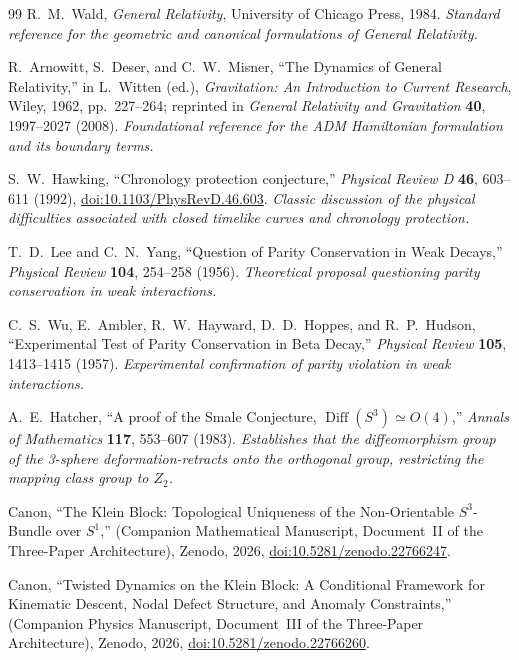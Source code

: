 \documentclass[11pt]{article}
\theoremstyle{canonstyle}
\providecommand{\Diff}{\operatorname{Diff}}
\def\mathbb#1{#1}%
\begin{document}
\begin{thebibliography}{99}
R.~M.~Wald, \textit{General Relativity}, University of Chicago Press, 1984.
\textit{Standard reference for the geometric and canonical formulations of General Relativity.}

R.~Arnowitt, S.~Deser, and C.~W.~Misner, ``The Dynamics of General Relativity,'' in L.~Witten (ed.), \textit{Gravitation: An Introduction to Current Research}, Wiley, 1962, pp.~227--264; reprinted in \textit{General Relativity and Gravitation} \textbf{40}, 1997--2027 (2008).
\textit{Foundational reference for the ADM Hamiltonian formulation and its boundary terms.}

S.~W.~Hawking, ``Chronology protection conjecture,'' \textit{Physical Review D} \textbf{46}, 603--611 (1992), \href{https://doi.org/10.1103/PhysRevD.46.603}{doi:10.1103/PhysRevD.46.603}.
\textit{Classic discussion of the physical difficulties associated with closed timelike curves and chronology protection.}

T.~D.~Lee and C.~N.~Yang, ``Question of Parity Conservation in Weak Decays,'' \textit{Physical Review} \textbf{104}, 254--258 (1956).
\textit{Theoretical proposal questioning parity conservation in weak interactions.}

C.~S.~Wu, E.~Ambler, R.~W.~Hayward, D.~D.~Hoppes, and R.~P.~Hudson, ``Experimental Test of Parity Conservation in Beta Decay,'' \textit{Physical Review} \textbf{105}, 1413--1415 (1957).
\textit{Experimental confirmation of parity violation in weak interactions.}

A.~E.~Hatcher, ``A proof of the Smale Conjecture, $\Diff(S^3) \simeq O(4)$,'' \textit{Annals of Mathematics} \textbf{117}, 553--607 (1983).
\textit{Establishes that the diffeomorphism group of the 3-sphere deformation-retracts onto the orthogonal group, restricting the mapping class group to $\mathbb{Z}_2$.}

Canon, ``The Klein Block: Topological Uniqueness of the Non-Orientable $S^3$-Bundle over $S^1$,'' (Companion Mathematical Manuscript, Document~II of the Three-Paper Architecture), Zenodo, 2026, \href{https://doi.org/10.5281/zenodo.22766247}{doi:10.5281/zenodo.22766247}.

Canon, ``Twisted Dynamics on the Klein Block: A Conditional Framework for Kinematic Descent, Nodal Defect Structure, and Anomaly Constraints,'' (Companion Physics Manuscript, Document~III of the Three-Paper Architecture), Zenodo, 2026, \href{https://doi.org/10.5281/zenodo.22766260}{doi:10.5281/zenodo.22766260}.

\end{thebibliography}
\end{document}
